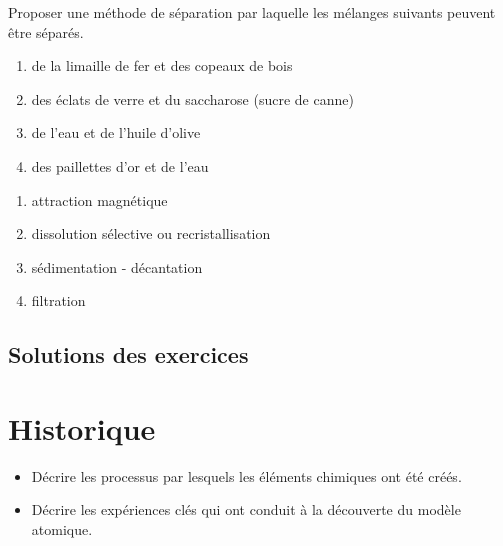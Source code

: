 \documentclass[
  11pt,
  a4paper,
  openany]{book}
\providecommand{\tightlist}{%
  \setlength{\itemsep}{0pt}\setlength{\parskip}{0pt}}
\begin{document}
\begin{Exercise}

Proposer une méthode de séparation par laquelle les mélanges suivants peuvent être séparés.

\begin{enumerate}
\def\labelenumi{\arabic{enumi}.}
\tightlist
\item
  de la limaille de fer et des copeaux de bois
\item
  des éclats de verre et du saccharose (sucre de canne)
\item
  de l'eau et de l'huile d'olive
\item
  des paillettes d'or et de l'eau
\end{enumerate}

\end{Exercise}

\begin{Answer}

\begin{enumerate}
\def\labelenumi{\arabic{enumi}.}
\tightlist
\item
  attraction magnétique
\item
  dissolution sélective ou recristallisation
\item
  sédimentation - décantation
\item
  filtration
\end{enumerate}

\end{Answer}

\newpage

\section{Solutions des exercices} \shipoutAnswer

\chapter{Historique}\label{historique}

\begin{objectives}

\begin{itemize}
\tightlist
\item
  Décrire les processus par lesquels les éléments chimiques ont été créés.
\item
  Décrire les expériences clés qui ont conduit à la découverte du modèle atomique.
\end{itemize}

\end{objectives}
\end{document}

